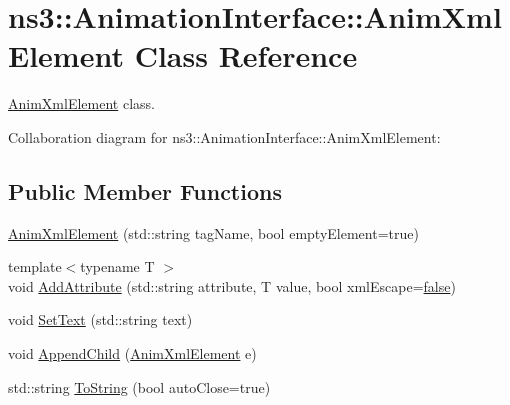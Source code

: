 \hypertarget{classns3_1_1AnimationInterface_1_1AnimXmlElement}{}\section{ns3\+:\+:Animation\+Interface\+:\+:Anim\+Xml\+Element Class Reference}
\label{classns3_1_1AnimationInterface_1_1AnimXmlElement}


\hyperlink{classns3_1_1AnimationInterface_1_1AnimXmlElement}{Anim\+Xml\+Element} class.  




Collaboration diagram for ns3\+:\+:Animation\+Interface\+:\+:Anim\+Xml\+Element\+:
\subsection*{Public Member Functions}
\begin{DoxyCompactItemize}
\item 
\hyperlink{classns3_1_1AnimationInterface_1_1AnimXmlElement_adbb2008e6cf430acd95e1f3de0b5dac7}{Anim\+Xml\+Element} (std\+::string tag\+Name, bool empty\+Element=true)
\item 
{\footnotesize template$<$typename T $>$ }\\void \hyperlink{classns3_1_1AnimationInterface_1_1AnimXmlElement_af2674ecb42b9384b8bc7e708a3724f5e}{Add\+Attribute} (std\+::string attribute, T value, bool xml\+Escape=\hyperlink{lte__cqi__generation_8m_ab1bef239d413c4da139c4bac92cd657a}{false})
\item 
void \hyperlink{classns3_1_1AnimationInterface_1_1AnimXmlElement_a910d4c4bed848bcf0e03cd754a2c9de4}{Set\+Text} (std\+::string text)
\item 
void \hyperlink{classns3_1_1AnimationInterface_1_1AnimXmlElement_a1e25e9c78d0529468a313cc8cf5a8446}{Append\+Child} (\hyperlink{classns3_1_1AnimationInterface_1_1AnimXmlElement}{Anim\+Xml\+Element} e)
\item 
std\+::string \hyperlink{classns3_1_1AnimationInterface_1_1AnimXmlElement_ab97cfaafbbd28bfbdfb82b2ce101740b}{To\+String} (bool auto\+Close=true)
\end{DoxyCompactItemize}

